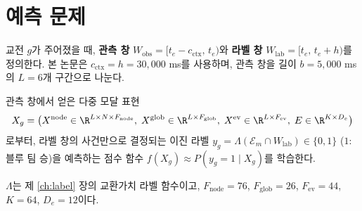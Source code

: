 
\section{예측 문제}
\label{sec:problem-prediction}

교전 $g$가 주어졌을 때, \textbf{관측 창} $W_{\mathrm{obs}} = [t_e - c_{\mathrm{ctx}},\, t_e)$와 \textbf{라벨 창} $W_{\mathrm{lab}} = [t_e,\, t_e + h)$를 정의한다. 본 논문은 $c_{\mathrm{ctx}} = h = 30{,}000$ ms를 사용하며, 관측 창을 길이 $b = 5{,}000$ ms의 $L = 6$개 구간으로 나눈다.

\begin{definition}[교전 결과 예측 문제]
관측 창에서 얻은 다중 모달 표현
\begin{equation}
  X_g = \big(X^{\mathrm{node}} \in \R^{L\times N\times F_{\mathrm{node}}},\; X^{\mathrm{glob}} \in \R^{L\times F_{\mathrm{glob}}},\; X^{\mathrm{ev}} \in \R^{L\times F_{\mathrm{ev}}},\; E \in \R^{K\times D_e}\big)
\end{equation}
로부터, 라벨 창의 사건만으로 결정되는 이진 라벨 $y_g = \Lambda(\mathcal{E}_m \cap W_{\mathrm{lab}}) \in \{0,1\}$ ($1$: 블루 팀 승)을 예측하는 점수 함수 $f(X_g) \approx P(y_g = 1 \mid X_g)$를 학습한다.
\end{definition}

$\Lambda$는 제 \ref{ch:label} 장의 교환가치 라벨 함수이고, $F_{\mathrm{node}} = 76$, $F_{\mathrm{glob}} = 26$, $F_{\mathrm{ev}} = 44$, $K = 64$, $D_e = 12$이다.
